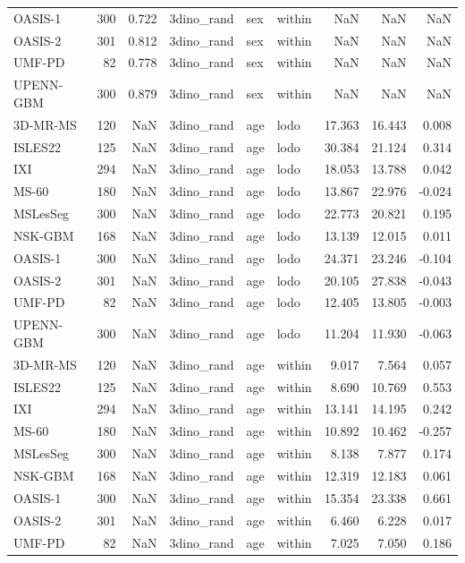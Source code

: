 \begin{tabular}{lrrlllrrr}
OASIS-1 & 300 & 0.722 & 3dino\_rand & sex & within & NaN & NaN & NaN \\
OASIS-2 & 301 & 0.812 & 3dino\_rand & sex & within & NaN & NaN & NaN \\
UMF-PD & 82 & 0.778 & 3dino\_rand & sex & within & NaN & NaN & NaN \\
UPENN-GBM & 300 & 0.879 & 3dino\_rand & sex & within & NaN & NaN & NaN \\
3D-MR-MS & 120 & NaN & 3dino\_rand & age & lodo & 17.363 & 16.443 & 0.008 \\
ISLES22 & 125 & NaN & 3dino\_rand & age & lodo & 30.384 & 21.124 & 0.314 \\
IXI & 294 & NaN & 3dino\_rand & age & lodo & 18.053 & 13.788 & 0.042 \\
MS-60 & 180 & NaN & 3dino\_rand & age & lodo & 13.867 & 22.976 & -0.024 \\
MSLesSeg & 300 & NaN & 3dino\_rand & age & lodo & 22.773 & 20.821 & 0.195 \\
NSK-GBM & 168 & NaN & 3dino\_rand & age & lodo & 13.139 & 12.015 & 0.011 \\
OASIS-1 & 300 & NaN & 3dino\_rand & age & lodo & 24.371 & 23.246 & -0.104 \\
OASIS-2 & 301 & NaN & 3dino\_rand & age & lodo & 20.105 & 27.838 & -0.043 \\
UMF-PD & 82 & NaN & 3dino\_rand & age & lodo & 12.405 & 13.805 & -0.003 \\
UPENN-GBM & 300 & NaN & 3dino\_rand & age & lodo & 11.204 & 11.930 & -0.063 \\
3D-MR-MS & 120 & NaN & 3dino\_rand & age & within & 9.017 & 7.564 & 0.057 \\
ISLES22 & 125 & NaN & 3dino\_rand & age & within & 8.690 & 10.769 & 0.553 \\
IXI & 294 & NaN & 3dino\_rand & age & within & 13.141 & 14.195 & 0.242 \\
MS-60 & 180 & NaN & 3dino\_rand & age & within & 10.892 & 10.462 & -0.257 \\
MSLesSeg & 300 & NaN & 3dino\_rand & age & within & 8.138 & 7.877 & 0.174 \\
NSK-GBM & 168 & NaN & 3dino\_rand & age & within & 12.319 & 12.183 & 0.061 \\
OASIS-1 & 300 & NaN & 3dino\_rand & age & within & 15.354 & 23.338 & 0.661 \\
OASIS-2 & 301 & NaN & 3dino\_rand & age & within & 6.460 & 6.228 & 0.017 \\
UMF-PD & 82 & NaN & 3dino\_rand & age & within & 7.025 & 7.050 & 0.186 \\

\end{tabular}
